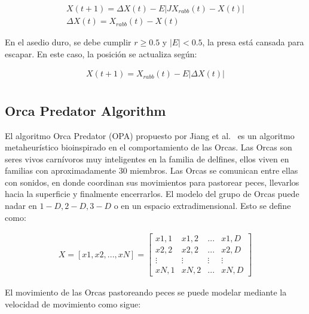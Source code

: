 \documentclass[conference]{IEEEtran}
\begin{document}
\begin{equation}
	\begin{gathered}
		X(t+1) = \Delta X(t) - E |J X_{rabb}(t) -X(t)| \\
		\Delta X(t) = X_{rabb}(t) - X(t)
	\end{gathered}
	\label{eq16}
\end{equation}

\noindent En el asedio duro, se debe cumplir $r \geq 0.5$ y $|E| < 0.5$, la presa está cansada para escapar. En este caso, la posición se actualiza según:

\begin{equation}
	\begin{gathered}
		X(t+1) = X_{rabb}(t) - E |\Delta X(t)| \\
	\end{gathered}
	\label{eq17}
\end{equation}

\subsection{Orca Predator Algorithm}

\noindent El algoritmo Orca Predator (OPA) propuesto por Jiang et al.~\cite{Jiang2022} es un algoritmo metaheurístico bioinspirado en el comportamiento de las Orcas. Las Orcas son seres vivos carnívoros muy inteligentes en la familia de delfines, ellos viven en familias con aproximadamente 30 miembros. Las Orcas se comunican entre ellas con sonidos, en donde coordinan sus movimientos para pastorear peces, llevarlos hacia la superficie y finalmente encerrarlos. El modelo del grupo de Orcas puede nadar en $1-D, 2-D, 3-D$ o en un espacio extradimensional. Esto se define como:

\begin{equation}
	\begin{gathered}
		X = [ x1, x2, ..., xN ] =\begin{bmatrix}
			x1,1 & x1,2 & ... & x1,D  \\
			x2,2 & x2,2 & ... & x2,D  \\
			\vdots & \vdots & \vdots & \vdots \\
			xN,1 & xN,2 & ... & xN,D
		\end{bmatrix}
	\end{gathered}
	\label{eq18}
\end{equation}

\noindent El movimiento de las Orcas pastoreando peces se puede modelar mediante la velocidad de movimiento como sigue:
\end{document}
